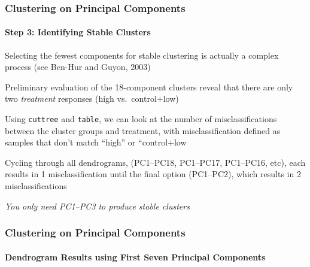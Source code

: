 \documentclass[10pt]{beamer}
\begin{document}
\begin{frame}[fragile]
\frametitle{Clustering on Principal Components}
\framesubtitle{Step 3: Identifying Stable Clusters}

\bi
\item Selecting the fewest components for stable clustering is actually
  a complex process (see Ben-Hur and Guyon, 2003)

\item Preliminary evaluation of the 18-component clusters reveal that
  there are only two {\em treatment} responses (high vs.~control$+$low)

\item Using {\color{red} \tt cuttree} and {\color{red} \tt table}, we
  can look at the number of misclassifications between the cluster
  groups and treatment, with misclassification defined as samples that
  don't match ``high'' or ``control$+$low

\item Cycling through all dendrograms, (PC1--PC18, PC1--PC17,
  PC1--PC16, etc), each results in 1 misclassification until the final
  option (PC1--PC2), which results in 2 misclassifications

{\color{blue} \em You only need PC1--PC3 to produce
  stable clusters}
\ei

\end{frame}


\begin{frame}[fragile]
\frametitle{Clustering on Principal Components}
\framesubtitle{Dendrogram Results using First Seven Principal Components}

\begin{center}
\end{center}

\end{frame}
\end{document}
